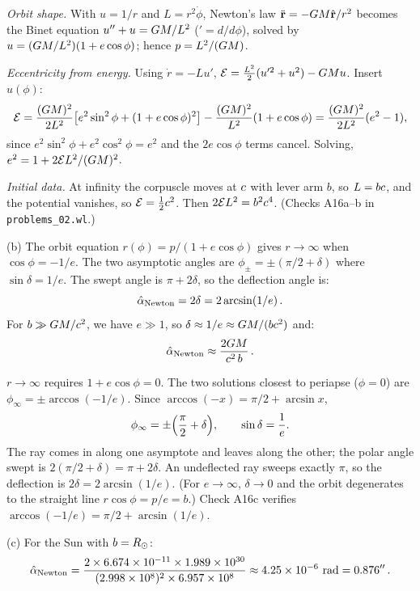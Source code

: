 \begin{derivation}
\textit{Orbit shape.}  With $u = 1/r$ and $L = r^2\dot\phi$, Newton's law
$\ddot{\mathbf r} = -G M\hat{\mathbf r}/r^2$ becomes the Binet equation
$u'' + u = G M/L^2$ ($' = d/d\phi$), solved by
$u = (G M/L^2)(1 + e\cos\phi)$; hence $p = L^2/(G M)$.

\textit{Eccentricity from energy.}  Using $\dot r = -L u'$,
$\mathcal{E} = \tfrac{L^2}{2}(u'^2 + u^2) - G M u$.  Insert $u(\phi)$:
\[
    \mathcal{E} = \frac{(G M)^2}{2L^2}\bigl[e^2\sin^2\phi
    + (1+e\cos\phi)^2\bigr] - \frac{(G M)^2}{L^2}(1+e\cos\phi)
    = \frac{(G M)^2}{2L^2}(e^2 - 1),
\]
since $e^2\sin^2\phi + e^2\cos^2\phi = e^2$ and the $2e\cos\phi$ terms
cancel.  Solving, $e^2 = 1 + 2\mathcal{E}L^2/(G M)^2$.

\textit{Initial data.}  At infinity the corpuscle moves at $c$ with
lever arm $b$, so $L = bc$, and the potential vanishes, so
$\mathcal{E} = \tfrac12c^2$.  Then
$2\mathcal{E}L^2 = b^2c^4$.  (Checks A16a--b in
\texttt{problems\_02.wl}.)
\end{derivation}
(b) The orbit equation $r(\phi) = p/(1 + e\cos\phi)$ gives
$r \to \infty$ when $\cos\phi = -1/e$.  The two asymptotic angles are
$\phi_\pm = \pm(\pi/2 + \delta)$ where $\sin\delta = 1/e$.  The swept
angle is $\pi + 2\delta$, so the deflection angle is:
\begin{equation*}
    \hat{\alpha}_{\mathrm{Newton}} = 2\delta = 2\arcsin(1/e) \,.
\end{equation*}
For $b \gg G M / c^2$, we have $e \gg 1$, so
$\delta \approx 1/e \approx G M / (b c^2)$ and:
\begin{equation*}
    \hat{\alpha}_{\mathrm{Newton}} \approx \frac{2G M}{c^2\, b} \,.
\end{equation*}


\begin{derivation}
$r \to \infty$ requires $1 + e\cos\phi = 0$.  The two solutions closest to
periapse ($\phi = 0$) are $\phi_\infty = \pm\arccos(-1/e)$.  Since
$\arccos(-x) = \pi/2 + \arcsin x$,
\[
    \phi_\infty = \pm\Bigl(\frac{\pi}{2} + \delta\Bigr), \qquad \sin\delta = \frac1e .
\]
The ray comes in along one asymptote and leaves along the other; the polar angle
swept is $2(\pi/2 + \delta) = \pi + 2\delta$.  An undeflected ray sweeps exactly
$\pi$, so the deflection is $2\delta = 2\arcsin(1/e)$.  (For $e \to \infty$,
$\delta \to 0$ and the orbit degenerates to the straight line $r\cos\phi = p/e
= b$.)  Check A16c verifies $\arccos(-1/e) = \pi/2 + \arcsin(1/e)$.
\end{derivation}
(c) For the Sun with $b = R_{\odot}$:
\begin{equation*}
    \hat{\alpha}_{\mathrm{Newton}} = \frac{2 \times 6.674 \times 10^{-11}
    \times 1.989 \times 10^{30}}{(2.998 \times 10^{8})^2 \times
    6.957 \times 10^{8}}
    \approx 4.25 \times 10^{-6}~\text{rad}
    = 0.876'' \,.
\end{equation*}


